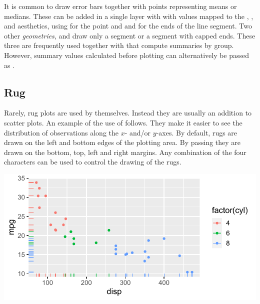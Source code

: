 \documentclass[krantz2]{krantz}\usepackage{knitr}
\begin{document}
It is common to draw error bars together with points representing means or medians. These can be added in a single layer with  with values mapped to the , ,  and  aesthetics, using  for the point and  and  for the ends of the line segment. Two other \emph{geometries},  and   draw only a segment or a segment with capped ends. These three  are frequently used together with  that compute summaries by group. However, summary values calculated before plotting can alternatively be passed as .

\subsection{Rug}\label{sec:plot:rug}

Rarely, rug plots are used by themselves. Instead they are usually an addition to scatter plots. An example of the use of  follows. They make it easier to see the distribution of observations along the $x$- and/or $y$-axes. By default, rugs are drawn on the left and bottom edges of the plotting area. By passing  they are drawn on the bottom, top, left and right margins. Any combination of the four characters can be used to control the drawing of the rugs.

\begin{knitrout}\footnotesize
{}\color{fgcolor}\begin{kframe}
\begin{alltt}
\hlstd{(} 
        \hlstd{=} \hlstd{(}     \hlstd{=}  \hlopt{+}
  \hlstd{()} \hlopt{+}
  \hlstd{(} \hlstd{=} \hlstd{)}
\end{alltt}
\end{kframe}

{\centering \includegraphics[width=.7\textwidth]{figure/pos-rug-plot-01-1} 

}


\end{knitrout}
\end{document}
